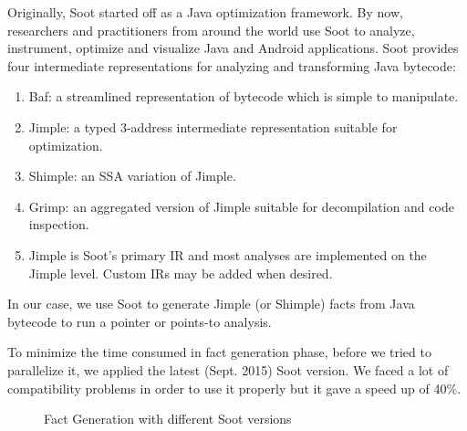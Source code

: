 \documentclass{dithesis}
\begin{document}
    Originally, Soot started off as a Java optimization framework. By now, researchers and practitioners from around the world use Soot to analyze, instrument, optimize and visualize Java and Android applications. Soot provides four intermediate representations for analyzing and transforming Java bytecode:
	\begin{enumerate}
		\item Baf: a streamlined representation of bytecode which is simple to manipulate.
		\item Jimple: a typed 3-address intermediate representation suitable for optimization.
		\item Shimple: an SSA variation of Jimple.
		\item Grimp: an aggregated version of Jimple suitable for decompilation and code inspection.
		\item Jimple is Soot’s primary IR and most analyses are implemented on the Jimple level. Custom IRs may be added when desired.
	\end{enumerate}
    In our case, we use Soot to generate Jimple (or Shimple) facts from Java bytecode to run a pointer or points-to analysis.
    \cite{Sable: Soot}
    
    	To minimize the time consumed in fact generation phase, before we tried to parallelize it, we applied the latest (Sept. 2015) Soot version. We faced a lot of compatibility problems in order to use it properly but it gave a speed up of 40\%.

		\begin{figure}[H]
			\centering
{}
			\caption{Fact Generation with different Soot versions}
		\end{figure}
\end{document}
